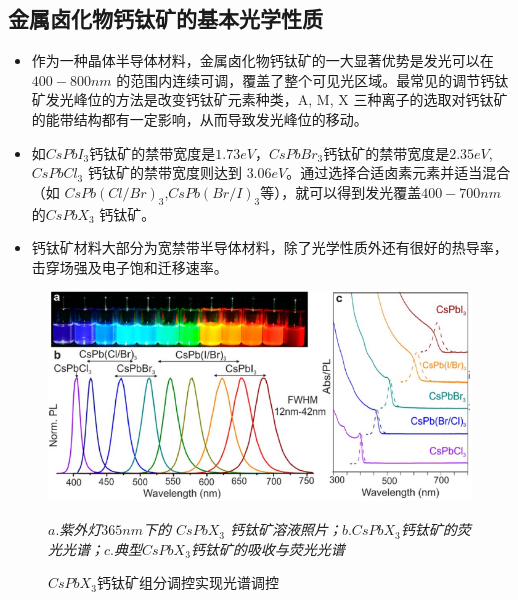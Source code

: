 \documentclass{beamer}[fontset=windows]
\begin{document}
\subsection{金属卤化物钙钛矿的基本光学性质}
\begin{frame}
	\begin{itemize}
		\item 作为一种晶体半导体材料，金属卤化物钙钛矿的一大显著优势是发光可以在$400-800 nm$ 的范围内连续可调，覆盖了整个可见光区域\cite{stranks2015metal}。最常见的调节钙钛矿发光峰位的方法是改变钙钛矿元素种类，A, M, X 三种离子的选取对钙钛矿的能带结构都有一定影响，从而导致发光峰位的移动\cite{sutherland2016perovskite}。
		\item 如$ CsPbI_{3}$钙钛矿的禁带宽度是$1.73eV$\cite{swarnkar2016quantum}，$CsPbBr_{3}$钙钛矿的禁带宽度是$2.35 eV$\cite{becker2018bright}, $CsPbCl_{3}$ 钙钛矿的禁带宽度则达到 $3.06 eV$\cite{becker2018bright}。通过选择合适卤素元素并适当混合（如 $CsPb(Cl/Br)_{3}$,$CsPb(Br/I)_{3}$等），就可以得到发光覆盖$400-700nm$的$CsPbX_{3}$ 钙钛矿。
		\item 钙钛矿材料大部分为宽禁带半导体材料，除了光学性质外还有很好的热导率，击穿场强及电子饱和迁移速率。
	\end{itemize}
\end{frame}	
\begin{frame}
	\begin{figure}[H]
		\centering
		\hspace{2em}\includegraphics[width=.75\linewidth]{pic/2.png}
		\caption{$CsPbX_{3}$钙钛矿组分调控实现光谱调控\cite{yakunin2015low}
		}
	\itshape
	$a.$紫外灯$365 nm$下的 $CsPbX_{3}$ 钙钛矿溶液照片；$b.CsPbX_{3}$钙钛矿的荧光光谱；$c.$典型$ CsPbX_{3} $钙钛矿的吸收与荧光光谱
	\end{figure}
\end{frame}
\end{document}
